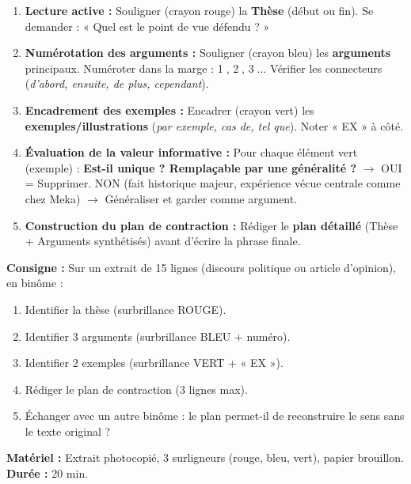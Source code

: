\documentclass[11pt]{article}
\newcommand{\cle}[1]{{\popxbold\color{popdark}#1}}
\begin{document}
\begin{methode}
\begin{enumerate}
    \item \textbf{Lecture active :} Souligner (crayon rouge) la \textbf{Thèse} (début ou fin). Se demander : « Quel est le \cle{point de vue} défendu ? »
    \item \textbf{Numérotation des arguments :} Souligner (crayon bleu) les \textbf{arguments} principaux. Numéroter dans la marge : \textcircled{1}, \textcircled{2}, \textcircled{3}... Vérifier les connecteurs (\textit{d'abord, ensuite, de plus, cependant}).
    \item \textbf{Encadrement des exemples :} Encadrer (crayon vert) les \textbf{exemples/illustrations} (\textit{par exemple, cas de, tel que}). Noter « EX » à côté.
    \item \textbf{Évaluation de la valeur informative :} Pour chaque élément vert (exemple) : \textbf{Est-il unique ? Remplaçable par une généralité ?} $\rightarrow$ OUI = Supprimer. NON (fait historique majeur, expérience vécue centrale comme chez Meka) $\rightarrow$ Généraliser et garder comme argument.
    \item \textbf{Construction du plan de contraction :} Rédiger le \textbf{plan détaillé} (Thèse + Arguments synthétisés) avant d'écrire la phrase finale.
\end{enumerate}
\end{methode}

\begin{experience}
\textbf{Consigne :} Sur un extrait de 15 lignes (discours politique ou article d'opinion), en binôme :
\begin{enumerate}
    \item Identifier la thèse (surbrillance \textcolor{popred}{ROUGE}).
    \item Identifier 3 arguments (surbrillance \textcolor{popblue}{BLEU} + numéro).
    \item Identifier 2 exemples (surbrillance \textcolor{popgreen}{VERT} + « EX »).
    \item Rédiger le plan de contraction (3 lignes max).
    \item Échanger avec un autre binôme : le plan permet-il de reconstruire le sens sans le texte original ?
\end{enumerate}
\textbf{Matériel :} Extrait photocopié, 3 surligneurs (rouge, bleu, vert), papier brouillon.
\textbf{Durée :} 20 min.
\end{experience}
\end{document}
